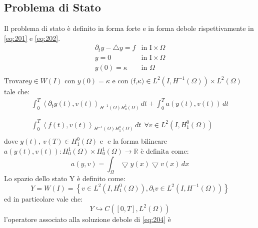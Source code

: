 \subsection{Problema di Stato}
Il problema di stato è definito in forma forte e in forma debole rispettivamente in \eqref{eq:201} e \eqref{eq:202}.
\begin{equation}
\begin{array}{cc}
 	{\partial_{t}}y - {\bigtriangleup}y = f & \text{in I}\times\Omega \\
	y=0 & \text{in I}\times\Omega \\
	y(0) = \kappa & \text{in }\Omega \\
\end{array}
\label{eq:201}
\end{equation}
$\text{Trovare} y \in W(I) \text{ con } y(0)=\kappa \text{ e } \text{con (f,}\kappa) \in L^2(I,{H^{-1}(\Omega)})\times {L^{2}(\Omega)}$ \\
tale che:
\begin{equation}
\begin{array}{c}
	\int_{0}^{T} \left \langle {\partial_{t}}y(t),v(t) \right \rangle_{{H^{-1}(\Omega)}{H^{1}_{0}(\Omega)}} \, dt +  	\int_{0}^{T} a(y(t),v(t)) \, dt  \\
	 = \\
	\int_{0}^{T} \left \langle f(t),v(t) \right \rangle_{{H^{-1}(\Omega)}{H^{0}_{1}(\Omega)}} \, dt \ \ \forall v \in L^2(I,{H^{0}_{1}(\Omega)}) \\
\end{array}
\label{eq:202}
\end{equation}
dove $y(t),\ v(T) \in {H^{0}_{1}(\Omega)} \text{ e } $ e la forma bilineare $a(y(t),v(t)): {H^{1}_{0}(\Omega)}{\times}{H^{1}_{0}(\Omega)}\rightarrow\mathbb{R}$ è definita come:
\begin{equation}
 a(y,v) = \int_{\Omega} {\bigtriangledown}y(x){\bigtriangledown}v(x) \, dx
\label{eq:203}
\end{equation}
Lo spazio dello stato Y è definito come:
\begin{equation}
Y = W(I) =  \left\{ v \in L^2(I, {H^{0}_{1}(\Omega)}), {{\partial}_{t}}v \in L^2(I, {H^{-1}(\Omega)}) \right\}
\label{eq:204}
\end{equation}
ed in particolare vale che:
\begin{equation}
Y \hookrightarrow C(\left[0,T\right], {L^{2}(\Omega)})
\label{eq:205}
\end{equation}
l'operatore associato alla soluzione debole di \ref{eq:204} è  

